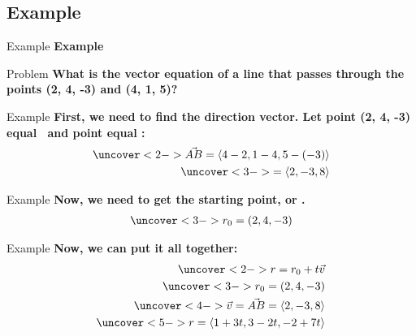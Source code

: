 \subsection{Example}
\frame{\subsectionpage}
\begin{frame}{Example}
    \textbf{Example}
    \begin{block}{Problem}
        \textbf{What is the vector equation of a line that passes through the points (2, 4, -3) and (4, 1, 5)?}
    \end{block}
\end{frame}
\begin{frame}{Example}
    \textbf{First, we need to find the direction vector. Let point (2, 4, -3) equal \begingroup{}\endgroup \ and point   equal \begingroup{}\endgroup :}
    \begin{align*}
        \uncover<2->{\vec{AB} = \langle 4-2, 1-4, 5-(-3) \rangle} \\
        \uncover<3->{= \langle 2, -3, 8 \rangle}
    \end{align*}
\end{frame}
\begin{frame}{Example}
    \textbf{Now, we need to get the starting point, or \begingroup{}\endgroup .} \\
    \begin{align*}
        \uncover<3->{r_0 = (2, 4, -3)}
    \end{align*}
\end{frame}
\begin{frame}{Example}
    \textbf{Now, we can put it all together:}
    \begin{align*}
        \uncover<2->{r = r_0 + t \vec{v}} \\
        \uncover<3->{r_0 = (2, 4, -3)} \\
        \uncover<4->{\vec{v} = \vec{AB} = \langle 2, -3, 8 \rangle} \\
        \uncover<5->{r = \langle 1+3t, 3-2t, -2+7t \rangle} \\
    \end{align*}
\end{frame}
